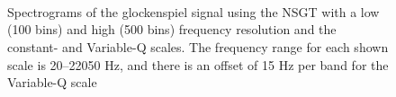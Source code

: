 \documentclass[report.tex]{subfiles}
\begin{document}
\begin{figure}[ht]
	\centering
	\\
	\\
	\\
	\caption{Spectrograms of the glockenspiel signal using the NSGT with a low (100 bins) and high (500 bins) frequency resolution and the constant- and Variable-Q scales. The frequency range for each shown scale is 20--22050 Hz, and there is an offset of 15 Hz per band for the Variable-Q scale}
	\label{fig:bunchansgts1}
\end{figure}
\end{document}
